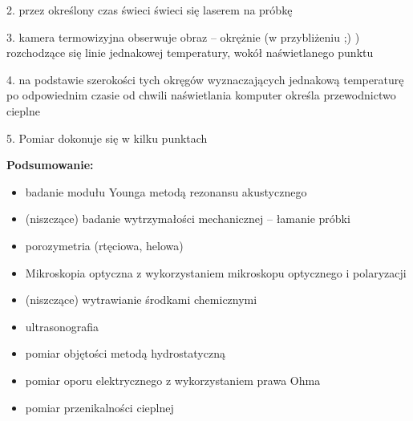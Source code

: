 \documentclass{article}
\begin{document}
\begin{enumerate}
2. przez określony czas świeci świeci się laserem na próbkę

3. kamera termowizyjna obserwuje obraz – okrężnie (w przybliżeniu ;) ) rozchodzące się linie jednakowej temperatury, wokół naświetlanego punktu

4. na podstawie szerokości tych okręgów wyznaczających jednakową temperaturę po odpowiednim czasie od chwili naświetlania komputer określa
 przewodnictwo cieplne
 
5. Pomiar dokonuje się w kilku punktach


{\bf Podsumowanie:}
\begin{itemize}
\item


badanie modułu Younga metodą rezonansu akustycznego
\item (niszczące) badanie wytrzymałości mechanicznej – łamanie próbki
\item porozymetria (rtęciowa, helowa)
\item Mikroskopia optyczna z wykorzystaniem mikroskopu optycznego i polaryzacji
\item (niszczące) wytrawianie środkami chemicznymi
\item ultrasonografia
\item pomiar objętości metodą hydrostatyczną
\item pomiar oporu elektrycznego z wykorzystaniem prawa Ohma
\item pomiar przenikalności cieplnej
\end{itemize}







\end{enumerate}
\end{document}
